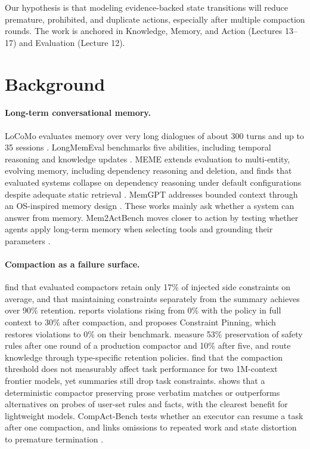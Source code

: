\documentclass[11pt]{article}
\begin{document}
Our hypothesis is that modeling evidence-backed state transitions will reduce premature, prohibited, and duplicate actions, especially after multiple compaction rounds. The work is anchored in Knowledge, Memory, and Action (Lectures 13--17) and Evaluation (Lecture 12).

\section{Background}

\paragraph{Long-term conversational memory.} LoCoMo evaluates memory over very long dialogues of about 300 turns and up to 35 sessions \citep{maharana2024locomo}. LongMemEval benchmarks five abilities, including temporal reasoning and knowledge updates \citep{wu2025longmemeval}. MEME extends evaluation to multi-entity, evolving memory, including dependency reasoning and deletion, and finds that evaluated systems collapse on dependency reasoning under default configurations despite adequate static retrieval \citep{jung2026meme}. MemGPT addresses bounded context through an OS-inspired memory design \citep{packer2023memgpt}. These works mainly ask whether a system can answer from memory. Mem2ActBench moves closer to action by testing whether agents apply long-term memory when selecting tools and grounding their parameters \citep{shen2026mem2act}.

\paragraph{Compaction as a failure surface.} \citet{wang2026lost} find that evaluated compactors retain only 17\% of injected side constraints on average, and that maintaining constraints separately from the summary achieves over 90\% retention. \citet{chen2026governance} reports violations rising from 0\% with the policy in full context to 30\% after compaction, and proposes Constraint Pinning, which restores violations to 0\% on their benchmark. \citet{zerhoudi2026cliff} measure 53\% preservation of safety rules after one round of a production compactor and 10\% after five, and route knowledge through type-specific retention policies. \citet{salle2026compaction} find that the compaction threshold does not measurably affect task performance for two 1M-context frontier models, yet summaries still drop task constraints. \citet{woolford2026transparent} shows that a deterministic compactor preserving prose verbatim matches or outperforms alternatives on probes of user-set rules and facts, with the clearest benefit for lightweight models. CompAct-Bench tests whether an executor can resume a task after one compaction, and links omissions to repeated work and state distortion to premature termination \citep{chen2026compactbench}.
\end{document}
